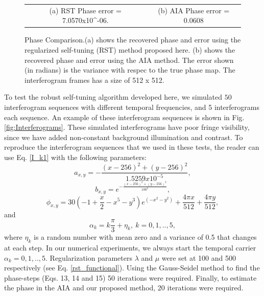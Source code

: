 \documentclass[letterpaper,12pt]{article}   %
\begin{document}
\begin{figure}[ t]
\begin{center}
\begin{tabular}{c c}
    (a) RST Phase error =  7.0570x10^{-06}. & (b) AIA Phase error =  0.0608
  \end{tabular}
\end{center}
\caption{Phase Comparison.(a) shows the recovered phase and error
  using the regularized self-tuning (RST) method proposed here. (b)
  shows the recovered phase and error using the AIA method. The error
  shown (in radians) is the variance with respec to the true phase
  map. The interferogram frames has a size of 512 x 512.}
\label{fig:phase}
\end{figure}

To test the robust self-tuning algorithm developed here, we simulated
$50$ interferogram sequences with different temporal frequencies, and
5 interferograms each sequence. An example of these interferogram
sequences is shown in Fig.\ref{fig:Interferograms}. These simulated
interferograms have poor fringe visibility, since we have added
non-constant background illumination and contrast.  To reproduce the
interferogram sequences that we used in these tests, the reader can
use Eq. \ref{I_k1} with the following parameters:
\begin{equation}
  a_{x,y}=-\frac{(x-256)^2+(y-256)^2}{1.5259x10^{-5}},
\end{equation}
\begin{equation}
  b_{x,y}=e^{-\frac{(x-256)^2+(y-256)^2}{100^{2}}},
\end{equation}
\begin{equation}
  \phi_{x,y}= 30(-1+\frac{x}{2}-x^5-y^3) e^{(-x^2-y^2)}+\frac{4\pi x}{512}+\frac{4\pi
    y}{512},
\end{equation}
and
\begin{equation}
  \alpha_k = k\frac{\pi}{3}+\eta_k,\: k=0,1,..,5,
\end{equation}
where $\eta_k$ is a random number with mean zero and a variance of 0.5
that changes at each step.  In our numerical experiments, we always
start the temporal carrier $\alpha_k=0,1,..,5$.  Regularization
parameters $\lambda$ and $\mu$ were set at 100 and 500 respectively
(see Eq. \ref{rst_functional}). Using the Gauss-Seidel method to find
the phase-steps (Eqs.  13, 14 and 15) 50 iterations were
required. Finally, to estimate the phase in the AIA and our proposed
method, 20 iterations were required.
\end{document}
